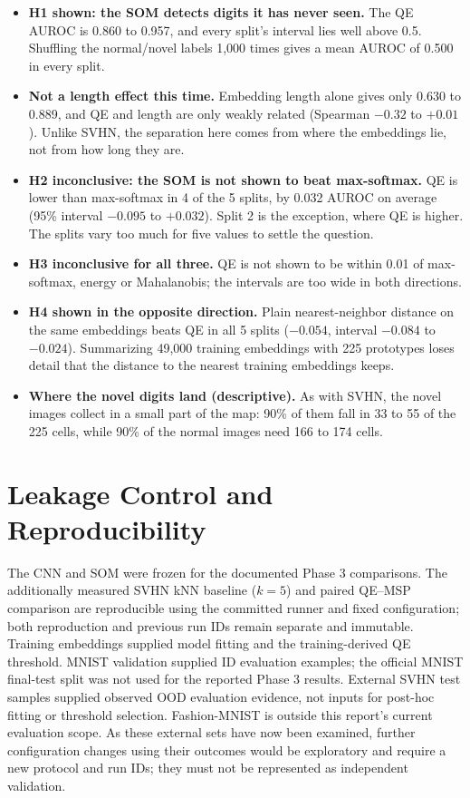 \documentclass[11pt]{article}
\begin{document}
\begin{itemize}[leftmargin=1.4em, itemsep=2pt]
\item \textbf{H1 shown: the SOM detects digits it has never seen.} The QE AUROC is 0.860 to 0.957, and every split's interval lies well above 0.5. Shuffling the normal/novel labels 1,000 times gives a mean AUROC of 0.500 in every split.
\item \textbf{Not a length effect this time.} Embedding length alone gives only 0.630 to 0.889, and QE and length are only weakly related (Spearman $-0.32$ to $+0.01$). Unlike SVHN, the separation here comes from where the embeddings lie, not from how long they are.
\item \textbf{H2 inconclusive: the SOM is not shown to beat max-softmax.} QE is lower than max-softmax in 4 of the 5 splits, by 0.032 AUROC on average (95\% interval $-0.095$ to $+0.032$). Split 2 is the exception, where QE is higher. The splits vary too much for five values to settle the question.
\item \textbf{H3 inconclusive for all three.} QE is not shown to be within 0.01 of max-softmax, energy or Mahalanobis; the intervals are too wide in both directions.
\item \textbf{H4 shown in the opposite direction.} Plain nearest-neighbor distance on the same embeddings beats QE in all 5 splits ($-0.054$, interval $-0.084$ to $-0.024$). Summarizing 49,000 training embeddings with 225 prototypes loses detail that the distance to the nearest training embeddings keeps.
\item \textbf{Where the novel digits land (descriptive).} As with SVHN, the novel images collect in a small part of the map: 90\% of them fall in 33 to 55 of the 225 cells, while 90\% of the normal images need 166 to 174 cells.
\end{itemize}

\section{Leakage Control and Reproducibility}
The CNN and SOM were frozen for the documented Phase 3 comparisons. The additionally measured SVHN kNN baseline ($k=5$) and paired QE--MSP comparison are reproducible using the committed runner and fixed configuration; both reproduction and previous run IDs remain separate and immutable. Training embeddings supplied model fitting and the training-derived QE threshold. MNIST validation supplied ID evaluation examples; the official MNIST final-test split was not used for the reported Phase 3 results. External SVHN test samples supplied observed OOD evaluation evidence, not inputs for post-hoc fitting or threshold selection. Fashion-MNIST is outside this report's current evaluation scope. As these external sets have now been examined, further configuration changes using their outcomes would be exploratory and require a new protocol and run IDs; they must not be represented as independent validation.
\end{document}
